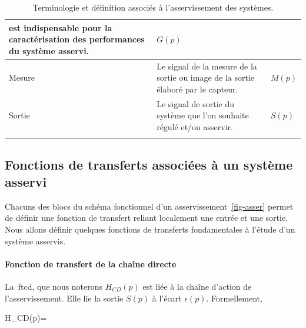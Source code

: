 \begin{table}[!h]
\begin{center}
\begin{tabular}{M{3cm}M{8cm}M{4cm}}
                   est indispensable pour la caractérisation des 
                   performances du système asservi.
                & $G(p)$                                                \\[0em]
        \hline
Mesure          & Le signal de la mesure de la sortie ou image de la sortie
                  élaboré par le capteur.
                & $M(p)$                                                \\[0em]
        \hline
Sortie          & Le signal de sortie du système que l'on souhaite 
                  régulé et/ou asservir.
                & $S(p)$                                   \\[0em]
        \hhline{===}
    \end{tabular}
\end{center}
\caption{Terminologie et définition associés à l'asservissement des 
         systèmes.\label{tab-asser}}
\end{table}

\clearpage

\subsection{Fonctions de transferts associées à un système asservi}

Chacuns des blocs du schéma fonctionnel d'un asservissement~\cref{fig-asser} 
permet de définir une fonction de transfert reliant localement une entrée 
et une sortie.
Nous allons définir quelques fonctions de transferts fondamentales à 
l'étude d'un système asservis.

\paragraph{Fonction de transfert de la chaîne directe}

La~\gls{ftcd}, que nous noterons $H_{CD}(p)$ est liée à 
la chaîne d'action de l'asservissement. Elle lie la sortie $S(p)$ à 
l'écart $\epsilon(p)$. Formellement,
\begin{bequation}
H_{CD}(p)=
\end{bequation}

